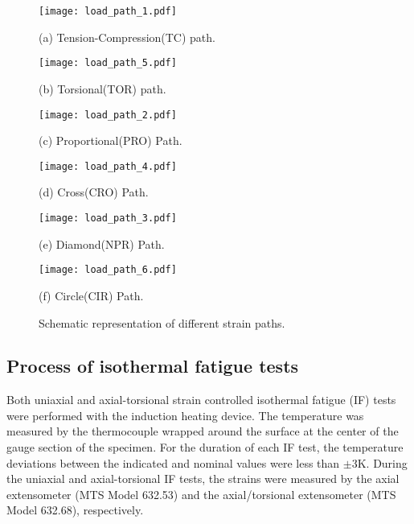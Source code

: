 \begin{figure}
  \begin{minipage}[t]{0.33\linewidth}
    \centering
    \texttt{[image: load\_path\_1.pdf]}
    \centerline{\small (a) Tension-Compression(TC) path.}
  \end{minipage}
  \begin{minipage}[t]{0.33\linewidth}
    \centering
    \texttt{[image: load\_path\_5.pdf]}
    \centerline{\small (b) Torsional(TOR) path.}
  \end{minipage}
  \begin{minipage}[t]{0.33\linewidth}
    \centering
    \texttt{[image: load\_path\_2.pdf]}
    \centerline{\small (c) Proportional(PRO) Path.}
  \end{minipage}%

  \begin{minipage}[t]{0.33\linewidth}
    \centering
    \texttt{[image: load\_path\_4.pdf]}
    \centerline{\small (d) Cross(CRO) Path.}
  \end{minipage}
  \begin{minipage}[t]{0.33\linewidth}
    \centering
    \texttt{[image: load\_path\_3.pdf]}
    \centerline{\small (e) Diamond(NPR) Path.}
  \end{minipage}
  \begin{minipage}[t]{0.33\linewidth}
    \centering
    \texttt{[image: load\_path\_6.pdf]}
    \centerline{\small (f) Circle(CIR) Path.}
  \end{minipage}%
  \caption{Schematic representation of different strain paths.}
  \label{Fig:LoadPath}
\end{figure}

\subsection{Process of isothermal fatigue tests}
\noindent
Both uniaxial and axial-torsional strain controlled isothermal fatigue (IF) tests were performed with the induction heating device.
The temperature was measured by the thermocouple wrapped around the surface at the center of the gauge section of the specimen.
For the duration of each IF test, the temperature deviations between the indicated and nominal values were less than $\pm$3K.
During the uniaxial and axial-torsional IF tests, the strains were measured by the axial extensometer (MTS Model 632.53) and the axial/torsional extensometer (MTS Model 632.68), respectively.

